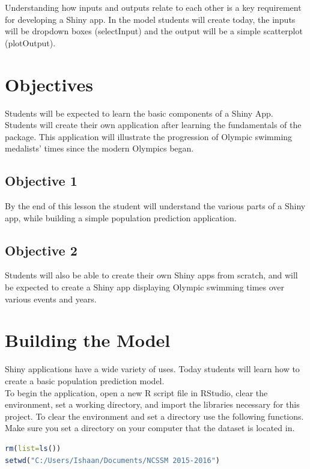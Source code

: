 Understanding how inputs and outputs relate to each other is a key requirement for developing a Shiny app. In the model students will create today, the inputs will be dropdown boxes (selectInput) and the output will be a simple scatterplot (plotOutput). 

\section{Objectives}

Students will be expected to learn the basic components of a Shiny App. Students will create their own application after learning the fundamentals of the package. This application will illustrate the progression of Olympic swimming medalists' times since the modern Olympics began. 

\subsection{Objective 1}
By the end of this lesson the student will understand the various parts of a Shiny app, while building a simple population prediction application.

\subsection{Objective 2}
Students will also be able to create their own Shiny apps from scratch, and will be expected to create a Shiny app displaying Olympic swimming times over various events and years.
 
\section{Building the Model}

Shiny applications have a wide variety of uses. Today students will learn how to create a basic population prediction model. \\

\noindent To begin the application, open a new R script file in RStudio, clear the environment, set a working directory, and import the libraries necessary for this project. To clear the environment and set a directory use the following functions. Make sure you set a directory on your computer that the dataset is located in. 

\begin{lstlisting}[language = R]
rm(list=ls())
setwd("C:/Users/Ishaan/Documents/NCSSM 2015-2016")
\end{lstlisting}

